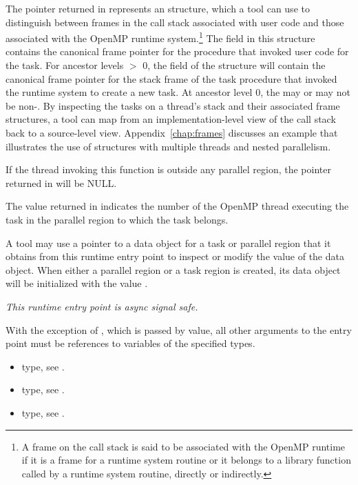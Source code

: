 The pointer returned in  represents an
 structure, which
a tool can use to distinguish between frames in the call stack 
associated with user code and those associated with
the OpenMP runtime system.\footnote{A frame 
on the call stack is said to be associated with 
the OpenMP runtime if it is a frame for a runtime system
routine or it belongs to a library function called by a runtime
system routine, directly or indirectly.} 
The  field in this structure contains the
canonical frame pointer for the procedure that invoked 
user code for the task. 
For ancestor levels $>$ 0, the 
 field of
the structure will contain the canonical frame pointer for the 
stack frame of the task procedure that invoked the runtime system to
create a new task. At ancestor level 0, the  may or
may not be non-. 
By inspecting the tasks on a thread's stack and their associated frame
structures,
a tool can map from an implementation-level view of the call stack
back to a source-level view.
Appendix~\ref{chap:frames} discusses an example that
illustrates the use of  structures with multiple
threads and nested parallelism.

If the thread invoking this function is outside any parallel region,
the pointer returned in  will be NULL.  

The value returned in  indicates the number of the
OpenMP thread executing the task in the parallel region to which the
task belongs.

A tool may use a pointer to a data object for a task or parallel
region that it obtains from this runtime entry point to inspect or modify the
value of the data object.  When either a parallel region or a task
region is created, its data object will be initialized with the value
.

{\em This runtime entry point is async signal safe.}

\constraints
With the exception of , which is passed by
value, all other arguments to the entry point must be references
to variables of the specified types.

\crossreferences
\begin{itemize}
\item {} type, see .
\item {} type, see .
\item {} type, see
  .
\end{itemize}


